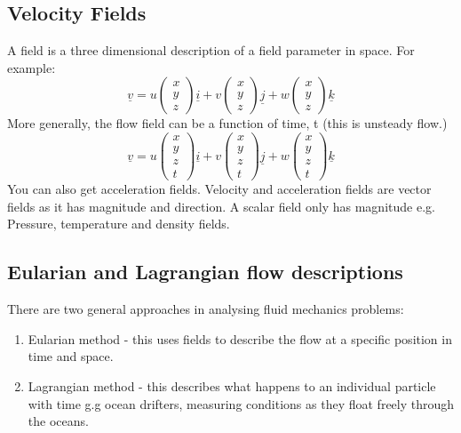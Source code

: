 \documentclass[class=report, crop=false, 12pt,a4paper]{standalone}
\begin{document}
\subsection{Velocity Fields}
A field is a three dimensional description of a field parameter in space. For example:
\begin{equation}  
  \underline{v} = u
  \begin{pmatrix}
    x\\
    y\\
    z
  \end{pmatrix} \underline{i} + v
  \begin{pmatrix}
    x\\
    y\\
    z
  \end{pmatrix} \underline{j} + w
  \begin{pmatrix}
    x\\
    y\\
    z
  \end{pmatrix} \underline{k}
\end{equation}
More generally, the flow field can be a function of time, t (this is unsteady flow.)
\begin{equation}
  \underline{v} = u
  \begin{pmatrix}
    x\\
    y\\
    z\\
    t
  \end{pmatrix} \underline{i} + v
  \begin{pmatrix}
    x\\
    y\\
    z\\
    t
  \end{pmatrix} \underline{j} + w
  \begin{pmatrix}
    x\\
    y\\
    z\\
    t
  \end{pmatrix} \underline{k}
\end{equation}
You can also get acceleration fields. Velocity and acceleration fields are vector fields as it has magnitude and direction. A scalar field only has magnitude e.g. Pressure, temperature and density fields.
\subsection{Eularian and Lagrangian flow descriptions}
There are two general approaches in analysing fluid mechanics problems:
\begin{enumerate}[noitemsep]
  \item Eularian method - this uses fields to describe the flow at a specific position in time and space. 
  \item Lagrangian method - this describes what happens to an individual particle with time g.g ocean drifters, measuring conditions as they float freely through the oceans.
\end{enumerate}
\end{document}
